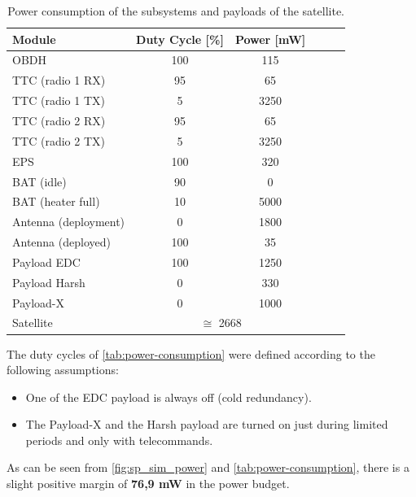 \begin{table}[!h]
    \centering
    \begin{tabular}{lccccc}
        \toprule[1.5pt]
        \textbf{Module} & \textbf{Duty Cycle [\%]}    & \textbf{Power [mW]} \\
        \midrule
        OBDH                    & 100   & 115 \\
        TTC (radio 1 RX)        & 95    & 65 \\
        TTC (radio 1 TX)        & 5     & 3250 \\
        TTC (radio 2 RX)        & 95    & 65 \\
        TTC (radio 2 TX)        & 5     & 3250 \\
        EPS                     & 100   & 320 \\
        BAT (idle)              & 90    & 0 \\
        BAT (heater full)       & 10    & 5000 \\
        Antenna (deployment)    & 0     & 1800 \\
        Antenna (deployed)      & 100   & 35 \\
        Payload EDC             & 100   & 1250 \\
        Payload Harsh           & 0     & 330 \\
        Payload-X               & 0     & 1000 \\
        \cmidrule{2-3}
        Satellite               & \multicolumn{2}{c}{$\cong$ 2668} \\
        \bottomrule[1.5pt]
    \end{tabular}
    \caption{Power consumption of the subsystems and payloads of the satellite.}
    \label{tab:power-consumption}
\end{table}

The duty cycles of \autoref{tab:power-consumption} were defined according to the following assumptions:

\begin{itemize}
    \item One of the EDC payload is always off (cold redundancy).
    \item The Payload-X and the Harsh payload are turned on just during limited periods and only with telecommands.
\end{itemize}

As can be seen from \autoref{fig:sp_sim_power} and \autoref{tab:power-consumption}, there is a slight positive margin of \textbf{76,9 mW} in the power budget.

